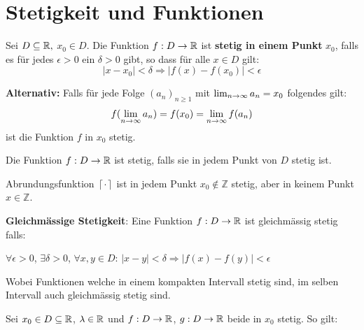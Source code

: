 \section{Stetigkeit und Funktionen}



\begin{tcolorbox}
    \Def Sei $D \subseteq \mathbb{R},$ $x_0 \in D$. Die Funktion $f : D \to \mathbb{R}$ ist \textbf{stetig 
    in einem Punkt} $x_0$, falls es für jedes $\epsilon > 0$ ein $\delta > 0$ gibt, so dass 
    für alle $x \in D$ gilt:
    $$|x - x_0| < \delta \Rightarrow |f(x) - f(x_0)| < \epsilon$$

    \textbf{Alternativ:} Falls für jede Folge $(a_n)_{n \geq 1}$ mit $\lim_{n \rightarrow \infty}
    a_n = x_0$ folgendes gilt:
    $$f(\lim_{n \rightarrow \infty} a_n) = f(x_0) = \lim_{n \rightarrow \infty} f(a_n)$$
    ist die Funktion $f$ in $x_0$ stetig.
\end{tcolorbox}

\Def Die Funktion $f : D \to \mathbb{R}$ ist stetig, falls sie in jedem Punkt von $D$ stetig ist.

\vspace{2mm}
\Bsp Abrundungsfunktion $\left\lceil \cdot \right\rceil$  ist in jedem Punkt $x_{0} \notin \mathbb{Z}$ 
stetig, aber in keinem Punkt $x \in \mathbb{Z}$.

\begin{tcolorbox}
    \textbf{Gleichmässige Stetigkeit}: Eine Funktion $f : D \to \mathbb{R}$ ist gleichmässig stetig falls:
    \begin{center}
        $\forall \epsilon > 0$, $\exists \delta > 0$, $\forall x,y \in D$: $|x - y| < \delta \Rightarrow |f(x) - f(y)| < \epsilon$
    \end{center}
    Wobei Funktionen welche in einem kompakten Intervall stetig sind, im selben Intervall auch gleichmässig
    stetig sind.
\end{tcolorbox}



Sei $x_0 \in D \subseteq \mathbb{R}$, $\lambda \in \mathbb{R}$ und $f : D \to \mathbb{R}$, $g : D \to \mathbb{R}$ beide in $x_0$ stetig.
So gilt:

